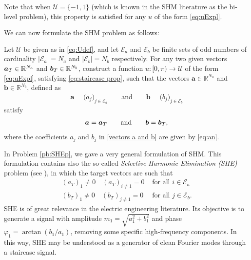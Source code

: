 \documentclass[9pt,shortpaper,twoside,web]{ieeecolor}
\begin{document}
Note that when $\mathcal{U} = \{-1,1\}$ (which is known in the SHM literature as the bi-level problem), this property is satisfied for any $u$ of the form \eqref{eq:uExpl}.

We can now formulate the SHM problem as follows:

\begin{problem}[SHM]\label{pb:SHEp}
	Let $\mathcal{U}$ be given as in \eqref{eq:Udef}, and let $\mathcal{E} _a $ and $\mathcal{E} _b $ be finite sets of odd numbers of cardinality $|\mathcal{E}_a| = N_a $ and $ |\mathcal{E} _b| = N_b$ respectively. For any two given vectors $\bm{a}_T \in \mathbb{R}^{N_a}$ and $\bm{b}_T \in \mathbb{R}^{N_b} $, construct a function $u: [0,\pi)\to\mathcal{U}$ of the form \eqref{eq:uExpl}, satisfying \eqref{eq:staircase prop}, such that the vectors $\bm{a} \in \mathbb{R}^{N_a}$ and $\bm{b} \in \mathbb{R}^{N_b}$, defined as
	\begin{align}\label{vectors a and b}
		\bm{a} = \big( a_j \big)_{j\in \mathcal{E}_a} \qquad \text{and} \qquad
		\bm{b} = \big( b_j \big)_{j\in \mathcal{E}_b}
	\end{align}
	satisfy
	\begin{align*} 
		\bm{a} = \bm{a}_T \qquad \text{and} \qquad \bm{b} = \bm{b}_T,
	\end{align*}
	where the coefficients $a_j$ and $b_j$ in \eqref{vectors a and b} are given by \eqref{eq:an}.
\end{problem}  

\begin{remark}[SHE]\label{remark:SHE}
	In Problem \ref{pb:SHEp}, we gave a very general formulation of SHM. This formulation contains also the so-called \emph{Selective Harmonic Elimination (SHE)} problem (see \cite{Sun1996}), in which the target vectors are such that 
	\begin{displaymath}
		\begin{array}{ll}
		(a_T)_1 \neq 0  \hspace{1em} (a_T)_{i\neq1} = 0 & \text{ for all } i \in \mathcal{E}_a 
		\\[3pt]
		(b_T)_1 \neq 0  \hspace{1em} (b_T)_{j\neq1} = 0 & \text{ for all } j \in \mathcal{E}_b. 
		\end{array} 
	\end{displaymath}
	SHE is of great relevance in the electric engineering literature. Its objective is to generate a signal with amplitude $m_1 = \sqrt{a_1^2+b_1^2}$ and phase $\varphi_1=\arctan(b_1/a_1)$, removing some specific high-frequency components. In this way, SHE may be understood as a generator of clean Fourier modes through a staircase signal.
\end{remark}
\end{document}
